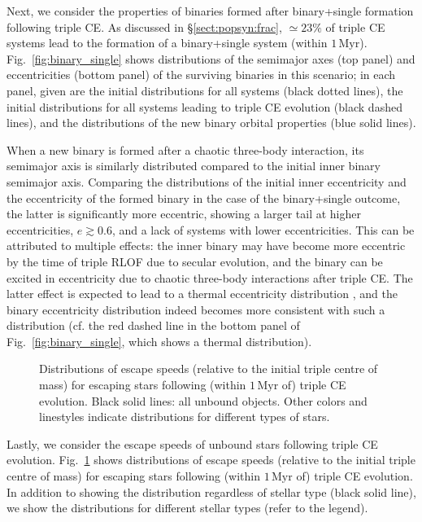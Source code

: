 \documentclass[twocolumn,appendixfloats,tighten]{aastex631}
\newcommand{\F}{Fig.}
\newcommand{\myr}{\mathrm{Myr}}
\begin{document}
Next, we consider the properties of binaries formed after binary+single formation following triple CE. As discussed in \S\ref{sect:popsyn:frac}, $\simeq 23\%$ of triple CE systems lead to the formation of a binary+single system (within $1\,\myr$). \F~\ref{fig:binary_single} shows distributions of the semimajor axes (top panel) and eccentricities (bottom panel) of the surviving binaries in this scenario; in each panel, given are the initial distributions for all systems (black dotted lines), the initial distributions for all systems leading to triple CE evolution (black dashed lines), and the distributions of the new binary orbital properties (blue solid lines). 

When a new binary is formed after a chaotic three-body interaction, its semimajor axis is similarly distributed compared to the initial inner binary semimajor axis. Comparing the distributions of the initial inner eccentricity and the eccentricity of the formed binary in the case of the binary+single outcome, the latter is significantly more eccentric, showing a larger tail at higher eccentricities, $e \gtrsim 0.6$, and a lack of systems with lower eccentricities. This can be attributed to multiple effects: the inner binary may have become more eccentric by the time of triple RLOF due to secular evolution, and the binary can be excited in eccentricity due to chaotic three-body interactions after triple CE. The latter effect is expected to lead to a thermal eccentricity distribution \citep[e.g.,][]{2016MNRAS.456.4219A,2019ApJ...872..165G}, and the binary eccentricity distribution indeed becomes more consistent with such a distribution (cf. the red dashed line in the bottom panel of \F~\ref{fig:binary_single}, which shows a thermal distribution).

\begin{figure}
\iftoggle{ApJFigs}{
\texttt{[image: TCE\_v\_esc]}
}{
\texttt{[image: figs/TCE\_v\_esc]}
}
\caption{Distributions of escape speeds (relative to the initial triple centre of mass) for escaping stars following (within $1\,\myr$ of) triple CE evolution. Black solid lines: all unbound objects. Other colors and linestyles indicate distributions for different types of stars. }
\label{fig:v_esc}
\end{figure}

Lastly, we consider the escape speeds of unbound stars following triple CE evolution. \F~\ref{fig:v_esc} shows distributions of escape speeds (relative to the initial triple centre of mass) for escaping stars following (within $1\,\myr$ of) triple CE evolution. In addition to showing the distribution regardless of stellar type (black solid line), we show the distributions for different stellar types (refer to the legend).
\end{document}
